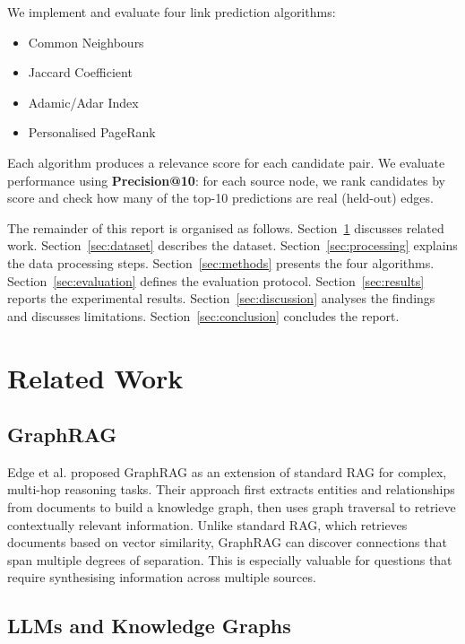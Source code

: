\documentclass[10pt]{article}
\begin{document}
We implement and evaluate four link prediction algorithms:
\begin{itemize}
  \item Common Neighbours
  \item Jaccard Coefficient
  \item Adamic/Adar Index
  \item Personalised PageRank
\end{itemize}

Each algorithm produces a relevance score for each candidate pair. We evaluate performance using \textbf{Precision@10}: for each source node, we rank candidates by score and check how many of the top-10 predictions are real (held-out) edges.

The remainder of this report is organised as follows. Section~\ref{sec:related} discusses related work. Section~\ref{sec:dataset} describes the dataset. Section~\ref{sec:processing} explains the data processing steps. Section~\ref{sec:methods} presents the four algorithms. Section~\ref{sec:evaluation} defines the evaluation protocol. Section~\ref{sec:results} reports the experimental results. Section~\ref{sec:discussion} analyses the findings and discusses limitations. Section~\ref{sec:conclusion} concludes the report.

\section{Related Work}
\label{sec:related}

\subsection{GraphRAG}

Edge et al. \cite{edge2024} proposed GraphRAG as an extension of standard RAG for complex, multi-hop reasoning tasks. Their approach first extracts entities and relationships from documents to build a knowledge graph, then uses graph traversal to retrieve contextually relevant information. Unlike standard RAG, which retrieves documents based on vector similarity, GraphRAG can discover connections that span multiple degrees of separation. This is especially valuable for questions that require synthesising information across multiple sources.

\subsection{LLMs and Knowledge Graphs}
\end{document}
